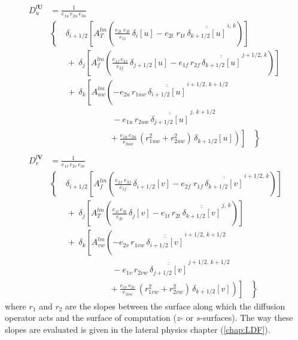 \documentclass[../main/NEMO_manual]{subfiles}
\begin{document}
\begin{equation}
  \label{eq:dyn_ldf_iso}
  \begin{split}
    D_u^{l\textbf{U}} &= \frac{1}{e_{1u} \, e_{2u} \, e_{3u} }	\\
    &  \left\{\quad  {\delta_{i+1/2} \left[ {A_T^{lm}  \left(
              {\frac{e_{2t} \; e_{3t} }{e_{1t} } \,\delta_{i}[u]
                -e_{2t} \; r_{1t} \,\overline{\overline {\delta_{k+1/2}[u]}}^{\,i,\,k}}
            \right)} \right]} 	\right. \\
    & \qquad +\ \delta_j \left[ {A_f^{lm} \left( {\frac{e_{1f}\,e_{3f} }{e_{2f}
            }\,\delta_{j+1/2} [u] - e_{1f}\, r_{2f}
            \,\overline{\overline {\delta_{k+1/2} [u]}} ^{\,j+1/2,\,k}}
        \right)} \right] \\
    &\qquad +\ \delta_k \left[ {A_{uw}^{lm} \left( {-e_{2u} \, r_{1uw} \,\overline{\overline
              {\delta_{i+1/2} [u]}}^{\,i+1/2,\,k+1/2} }
        \right.} \right. \\
    &  \ \qquad \qquad \qquad \quad\
    - e_{1u} \, r_{2uw} \,\overline{\overline {\delta_{j+1/2} [u]}} ^{\,j,\,k+1/2} \\
    & \left. {\left. { \ \qquad \qquad \qquad \ \ \ \left. {\
                +\frac{e_{1u}\, e_{2u} }{e_{3uw} }\,\left( {r_{1uw}^2+r_{2uw}^2}
                \right)\,\delta_{k+1/2} [u]} \right)} \right]\;\;\;} \right\} \\ \\
    D_v^{l\textbf{V}} &= \frac{1}{e_{1v} \, e_{2v} \, e_{3v} } \\
    &  \left\{\quad  {\delta_{i+1/2} \left[ {A_f^{lm}  \left(
              {\frac{e_{2f} \; e_{3f} }{e_{1f} } \,\delta_{i+1/2}[v]
                -e_{2f} \; r_{1f} \,\overline{\overline {\delta_{k+1/2}[v]}}^{\,i+1/2,\,k}}
            \right)} \right]} 	\right. \\
    & \qquad +\ \delta_j \left[ {A_T^{lm} \left( {\frac{e_{1t}\,e_{3t} }{e_{2t} 
            }\,\delta_{j} [v] - e_{1t}\, r_{2t}
            \,\overline{\overline {\delta_{k+1/2} [v]}} ^{\,j,\,k}}
        \right)} \right] \\
    & \qquad +\ \delta_k \left[ {A_{vw}^{lm} \left( {-e_{2v} \, r_{1vw} \,\overline{\overline 
              {\delta_{i+1/2} [v]}}^{\,i+1/2,\,k+1/2} }\right.} \right. \\
    &  \ \qquad \qquad \qquad \quad\
    - e_{1v} \, r_{2vw} \,\overline{\overline {\delta_{j+1/2} [v]}} ^{\,j+1/2,\,k+1/2} \\
    & \left. {\left. { \ \qquad \qquad \qquad \ \ \ \left. {\ 
                +\frac{e_{1v}\, e_{2v} }{e_{3vw} }\,\left( {r_{1vw}^2+r_{2vw}^2}
                \right)\,\delta_{k+1/2} [v]} \right)} \right]\;\;\;} \right\} 
  \end{split}
\end{equation}
where $r_1$ and $r_2$ are the slopes between the surface along which the diffusion operator acts and
the surface of computation ($z$- or $s$-surfaces). 
The way these slopes are evaluated is given in the lateral physics chapter (\autoref{chap:LDF}).
\end{document}
